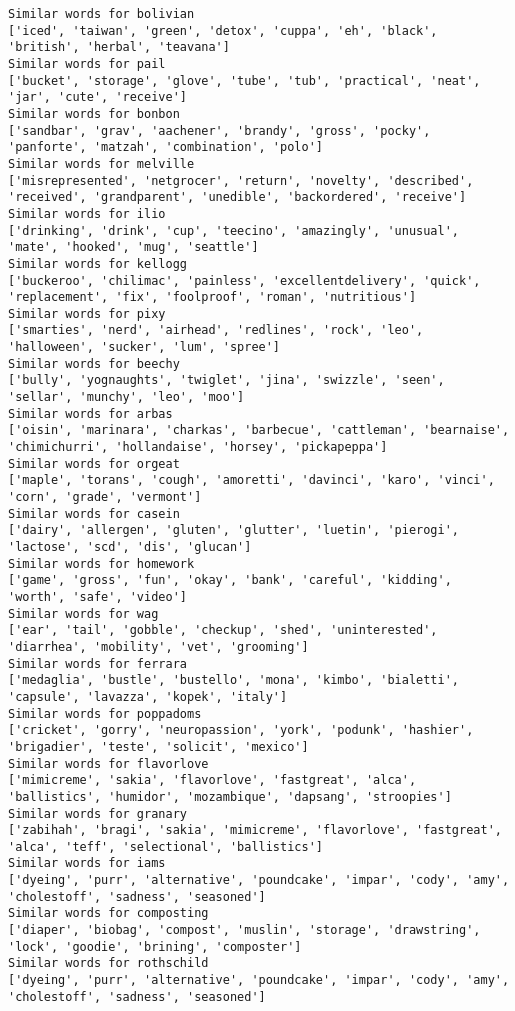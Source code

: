 \documentclass[11pt]{article}
\begin{document}
\begin{Verbatim}[commandchars=\\\{\}]
Similar words for bolivian
['iced', 'taiwan', 'green', 'detox', 'cuppa', 'eh', 'black', 'british', 'herbal', 'teavana']
Similar words for pail
['bucket', 'storage', 'glove', 'tube', 'tub', 'practical', 'neat', 'jar', 'cute', 'receive']
Similar words for bonbon
['sandbar', 'grav', 'aachener', 'brandy', 'gross', 'pocky', 'panforte', 'matzah', 'combination', 'polo']
Similar words for melville
['misrepresented', 'netgrocer', 'return', 'novelty', 'described', 'received', 'grandparent', 'unedible', 'backordered', 'receive']
Similar words for ilio
['drinking', 'drink', 'cup', 'teecino', 'amazingly', 'unusual', 'mate', 'hooked', 'mug', 'seattle']
Similar words for kellogg
['buckeroo', 'chilimac', 'painless', 'excellentdelivery', 'quick', 'replacement', 'fix', 'foolproof', 'roman', 'nutritious']
Similar words for pixy
['smarties', 'nerd', 'airhead', 'redlines', 'rock', 'leo', 'halloween', 'sucker', 'lum', 'spree']
Similar words for beechy
['bully', 'yognaughts', 'twiglet', 'jina', 'swizzle', 'seen', 'sellar', 'munchy', 'leo', 'moo']
Similar words for arbas
['oisin', 'marinara', 'charkas', 'barbecue', 'cattleman', 'bearnaise', 'chimichurri', 'hollandaise', 'horsey', 'pickapeppa']
Similar words for orgeat
['maple', 'torans', 'cough', 'amoretti', 'davinci', 'karo', 'vinci', 'corn', 'grade', 'vermont']
Similar words for casein
['dairy', 'allergen', 'gluten', 'glutter', 'luetin', 'pierogi', 'lactose', 'scd', 'dis', 'glucan']
Similar words for homework
['game', 'gross', 'fun', 'okay', 'bank', 'careful', 'kidding', 'worth', 'safe', 'video']
Similar words for wag
['ear', 'tail', 'gobble', 'checkup', 'shed', 'uninterested', 'diarrhea', 'mobility', 'vet', 'grooming']
Similar words for ferrara
['medaglia', 'bustle', 'bustello', 'mona', 'kimbo', 'bialetti', 'capsule', 'lavazza', 'kopek', 'italy']
Similar words for poppadoms
['cricket', 'gorry', 'neuropassion', 'york', 'podunk', 'hashier', 'brigadier', 'teste', 'solicit', 'mexico']
Similar words for flavorlove
['mimicreme', 'sakia', 'flavorlove', 'fastgreat', 'alca', 'ballistics', 'humidor', 'mozambique', 'dapsang', 'stroopies']
Similar words for granary
['zabihah', 'bragi', 'sakia', 'mimicreme', 'flavorlove', 'fastgreat', 'alca', 'teff', 'selectional', 'ballistics']
Similar words for iams
['dyeing', 'purr', 'alternative', 'poundcake', 'impar', 'cody', 'amy', 'cholestoff', 'sadness', 'seasoned']
Similar words for composting
['diaper', 'biobag', 'compost', 'muslin', 'storage', 'drawstring', 'lock', 'goodie', 'brining', 'composter']
Similar words for rothschild
['dyeing', 'purr', 'alternative', 'poundcake', 'impar', 'cody', 'amy', 'cholestoff', 'sadness', 'seasoned']

\end{Verbatim}
\end{document}
